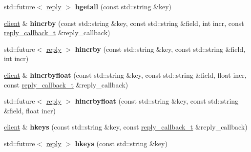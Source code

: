 \begin{DoxyCompactItemize}
\item 
\mbox{\label{classcpp__redis_1_1client_a44321960e02c6ee6b6b36ffc960e4257}} 
std\+::future$<$ \hyperlink{classcpp__redis_1_1reply}{reply} $>$ {\bfseries hgetall} (const std\+::string \&key)
\item 
\mbox{\label{classcpp__redis_1_1client_a517b6bdeb07edf20f5e57eb1b4942dd5}} 
\hyperlink{classcpp__redis_1_1client}{client} \& {\bfseries hincrby} (const std\+::string \&key, const std\+::string \&field, int incr, const \hyperlink{classcpp__redis_1_1client_a061a1140d36d2eaeda82b09a0bb3f9f2}{reply\+\_\+callback\+\_\+t} \&reply\+\_\+callback)
\item 
\mbox{\label{classcpp__redis_1_1client_aee1f9d8b1fe77bc5bed18000a9cf8b6f}} 
std\+::future$<$ \hyperlink{classcpp__redis_1_1reply}{reply} $>$ {\bfseries hincrby} (const std\+::string \&key, const std\+::string \&field, int incr)
\item 
\mbox{\label{classcpp__redis_1_1client_ade2a386b51e8bbd59cd7feef51bd0637}} 
\hyperlink{classcpp__redis_1_1client}{client} \& {\bfseries hincrbyfloat} (const std\+::string \&key, const std\+::string \&field, float incr, const \hyperlink{classcpp__redis_1_1client_a061a1140d36d2eaeda82b09a0bb3f9f2}{reply\+\_\+callback\+\_\+t} \&reply\+\_\+callback)
\item 
\mbox{\label{classcpp__redis_1_1client_a6b856272a5956b3b2839c5b5749c9b97}} 
std\+::future$<$ \hyperlink{classcpp__redis_1_1reply}{reply} $>$ {\bfseries hincrbyfloat} (const std\+::string \&key, const std\+::string \&field, float incr)
\item 
\mbox{\label{classcpp__redis_1_1client_a432f322ff1818fa65208725b1be7f4d2}} 
\hyperlink{classcpp__redis_1_1client}{client} \& {\bfseries hkeys} (const std\+::string \&key, const \hyperlink{classcpp__redis_1_1client_a061a1140d36d2eaeda82b09a0bb3f9f2}{reply\+\_\+callback\+\_\+t} \&reply\+\_\+callback)
\item 
\mbox{\label{classcpp__redis_1_1client_a578dade240f8fbbd6ba797bff9be18dd}} 
std\+::future$<$ \hyperlink{classcpp__redis_1_1reply}{reply} $>$ {\bfseries hkeys} (const std\+::string \&key)

\end{DoxyCompactItemize}
